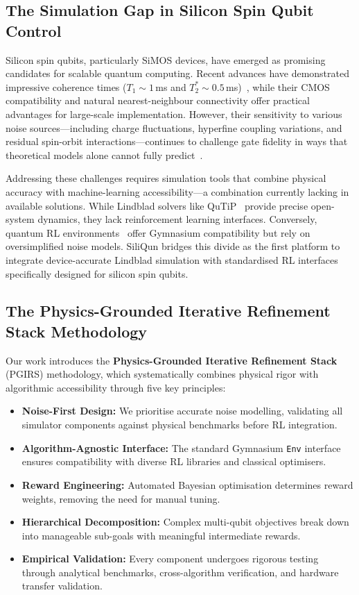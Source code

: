 \subsection{The Simulation Gap in Silicon Spin Qubit Control}
\label{subsec:simulation_gap}

Silicon spin qubits, particularly SiMOS devices, have emerged as promising candidates for scalable quantum computing. Recent advances have demonstrated impressive coherence times ($T_1 \sim 1$\,ms and $T_2^* \sim 0.5$\,ms)~\cite{Xue2022,Noiri2022,Philips2022}, while their CMOS compatibility and natural nearest-neighbour connectivity offer practical advantages for large-scale implementation. However, their sensitivity to various noise sources—including charge fluctuations, hyperfine coupling variations, and residual spin-orbit interactions—continues to challenge gate fidelity in ways that theoretical models alone cannot fully predict~\cite{Veldhorst2015,Fogarty2018}.

Addressing these challenges requires simulation tools that combine physical accuracy with machine-learning accessibility—a combination currently lacking in available solutions. While Lindblad solvers like QuTiP~\cite{Johansson2012,Johansson2013} provide precise open-system dynamics, they lack reinforcement learning interfaces. Conversely, quantum RL environments~\cite{VanDerLinde2023,QiskitGym2024} offer Gymnasium compatibility but rely on oversimplified noise models. SiliQun bridges this divide as the first platform to integrate device-accurate Lindblad simulation with standardised RL interfaces specifically designed for silicon spin qubits.

\subsection{The Physics-Grounded Iterative Refinement Stack Methodology}
\label{subsec:intro_pgirs}

Our work introduces the \textbf{Physics-Grounded Iterative Refinement Stack} (PGIRS) methodology, which systematically combines physical rigor with algorithmic accessibility through five key principles:

\begin{itemize}
  \item \textbf{Noise-First Design:} We prioritise accurate noise modelling, validating all simulator components against physical benchmarks before RL integration.
  \item \textbf{Algorithm-Agnostic Interface:} The standard Gymnasium \texttt{Env} interface ensures compatibility with diverse RL libraries and classical optimisers.
  \item \textbf{Reward Engineering:} Automated Bayesian optimisation determines reward weights, removing the need for manual tuning.
  \item \textbf{Hierarchical Decomposition:} Complex multi-qubit objectives break down into manageable sub-goals with meaningful intermediate rewards.
  \item \textbf{Empirical Validation:} Every component undergoes rigorous testing through analytical benchmarks, cross-algorithm verification, and hardware transfer validation.
\end{itemize}

